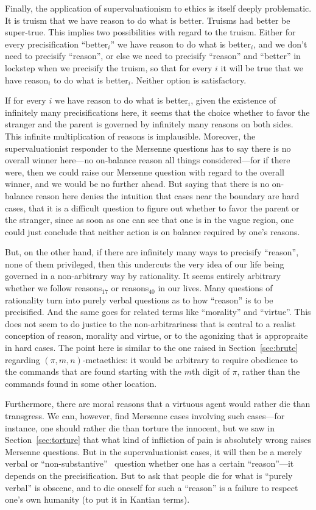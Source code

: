 Finally, the application of supervaluationism to ethics is itself deeply problematic. It is truism that we have reason to do what is better. Truisms had better be 
super-true. 
This implies two possibilities with regard to the truism.
Either for every precisification ``better$_i$'' we have reason to do what is better$_i$, and we don't need to 
precisify ``reason'', or else we need to precisify ``reason'' and ``better'' in lockstep
when we precisify the truism, so that for every $i$ it will be true that we have reason$_i$ to do what is better$_i$. Neither option is satisfactory.

If for every $i$ we have reason to do what is better$_i$, given the existence of infinitely many precisifications here, it seems that the choice whether to
favor the stranger and the parent is governed by infinitely many reasons on both sides. This infinite multiplication of reasons is implausible. Moreover, the supervaluationist responder to the Mersenne questions has to say there is 
no overall winner here---no on-balance reason all things considered---for if
there were, then we could raise our Mersenne question with regard to the overall winner, and we would be no further ahead. But saying that there is no on-balance reason
here denies the intuition that cases near the boundary are hard cases, that it is a difficult question to figure out whether to favor the parent or the stranger, since
as soon as one can see that one is in the vague region, one could just conclude that neither action is on balance required by one's reasons. 

But, on the other hand, if there are infinitely many ways to precisify ``reason'', none of them privileged, then this undercuts the very idea of our life being governed in
a non-arbitrary way by rationality. It seems entirely arbitrary whether we follow reasons$_{17}$ or reasons$_{40}$ in our lives. Many questions of rationality
turn into purely verbal questions as to how ``reason'' is to be precisified. And the same goes for related terms like ``morality'' and ``virtue''. This 
does not seem to do justice to the non-arbitrariness that is central to a realist conception of reason, morality and virtue, or to the agonizing that is appropraite in hard cases. The point here is similar to the
one raised in Section~\ref{sec:brute} regarding $(\pi,m,n)$-metaethics: it would be arbitrary to require obedience to the commands that are found starting with the $m$th digit of $\pi$,
rather than the commands found in some other location. 

Furthermore, there are moral reasons that a virtuous agent would rather die than transgress. We can, however, 
find Mersenne cases involving such cases---for instance, one should rather die than torture the innocent, but 
we saw in Section~\ref{sec:torture} that what kind of infliction of pain is absolutely wrong raises Mersenne questions. But 
in the supervaluationist cases, it will then be a merely verbal or ``non-substantive''~\parencite[Chapter~4]{SiderWriting} question whether one has a certain ``reason''---it depends
on the precisification. But to ask that people die for what is ``purely verbal'' is
obscene, and to die oneself for such a ``reason'' is a failure to respect one's own humanity (to put it in Kantian
terms).

